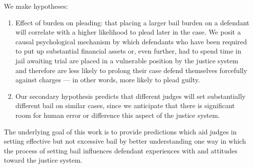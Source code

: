 We make \nextitemizecount{} hypotheses:
\begin{enumerate}
\item Effect of burden on pleading:
      that placing a larger bail burden on a defendant will correlate with a
      higher likelihood to plead later in the case.
      We posit a causal psychological mechanism by which
      defendants who have been required to put up substantial financial assets or,
      even further,
      had to spend time in jail awaiting trial are placed in a vulnerable position
      by the justice system and
      therefore are less likely to prolong their case defend themselves forcefully against charges
      --- in other words, more likely to plead guilty.
\item Our secondary hypothesis predicts that
      different judges will set substantially different bail on similar cases,
      since we anticipate that there is significant room for human error or
      difference this aspect of the justice system.
\end{enumerate}

The underlying goal of this work is
to provide predictions which aid judges in setting effective but
not excessive bail by
better understanding one way in which the process of setting bail influences
defendant experiences with and attitudes toward the justice system.